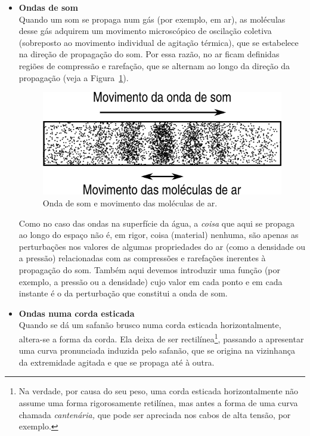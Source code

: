 \begin{itemize}
\item \textbf{Ondas de som}\\
    Quando um som se propaga num gás (por exemplo, em ar), as moléculas desse
    gás adquirem um movimento microscópico de oscilação coletiva (sobreposto ao
    movimento individual de agitação térmica), que se estabelece na direção de
    propagação do som. Por essa razão, no ar ficam definidas regiões de
    compressão e rarefação, que se alternam ao longo da direção da propagação
    (veja a Figura~\ref{fig:oof020}).
    \begin{figure}[htb]
        {\centering
            \includegraphics{sections/01waveintro/figs/oof020.png}
            \caption{Onda de som e movimento das moléculas de ar.%
                \label{fig:oof020}}

        }
    \end{figure}
    Como no caso das ondas na superfície da água, a \emph{coisa} que aqui se
    propaga ao longo do espaço não é, em rigor, coisa (material) nenhuma, são
    apenas as perturbações nos valores de algumas propriedades do ar (como a
    densidade ou a pressão) relacionadas com as compressões e rarefações
    inerentes à propagação do som. Também aqui devemos introduzir uma função
    (por exemplo, a pressão ou a densidade) cujo valor em cada ponto e em cada
    instante é o da perturbação que constitui a onda de som.

\item \textbf{Ondas numa corda esticada}\\
    Quando se dá um safanão brusco numa corda esticada horizontalmente,
    altera-se a forma da corda. Ela deixa de ser rectilínea\footnote{Na verdade,
    por causa do seu peso, uma corda esticada horizontalmente não assume uma
    forma rigorosamente retilínea, mas antes a forma de uma curva chamada
    \emph{cantenária,} que pode ser apreciada nos cabos de alta tensão, por
    exemplo.}, passando a apresentar uma curva pronunciada induzida pelo
    safanão, que se origina na vizinhança da extremidade agitada e que se
    propaga até à outra.


\end{itemize}
